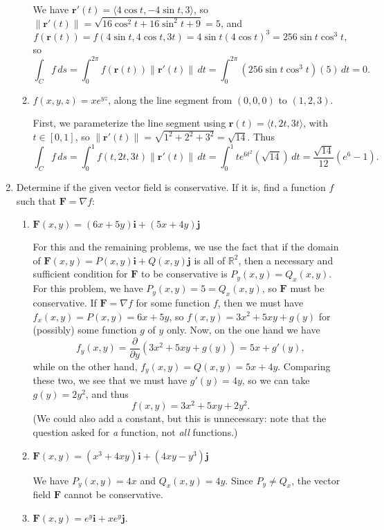 \documentclass[letterpaper,12pt]{article}
\newcommand{\R}{\mathbb{R}}
\renewcommand{\i}{\mathbf{i}}
\renewcommand{\j}{\mathbf{j}}
\renewcommand{\r}{\mathbf{r}}
\newcommand{\len}[1]{\left\lVert #1\right\rVert}
\newcommand{\F}{\mathbf{F}}
\begin{document}
\begin{enumerate}
\begin{enumerate}
\bigskip

We have $\r'(t) = \langle 4\cos t, -4\sin t, 3\rangle$, so $\len{\r'(t)} = \sqrt{16\cos^2t+16\sin^2t+9} = 5$, and 
\[
 f(\r(t)) = f(4\sin t, 4\cos t, 3t) = 4\sin t(4\cos t)^3 = 256\sin t\cos^3t,
\]
so
\[
 \int_C f\,ds = \int_0^{2\pi}f(\r(t))\len{\r'(t)}\,dt = \int_0^{2\pi} (256\sin t\cos^3t)(5)\,dt = 0.
\]

 \item $f(x,y,z)=xe^{yz}$, along the line segment from $(0,0,0)$ to $(1,2,3)$.

First, we parameterize the line segment using $\r(t) = \langle t, 2t, 3t\rangle$, with $t\in [0,1]$, so $\len{\r'(t)} = \sqrt{1^2+2^2+3^2} = \sqrt{14}$. Thus
\[
 \int_C f\,ds = \int_0^1 f(t, 2t, 3t) \len{\r'(t)}\,dt = \int_0^1 te^{6t^2}(\sqrt{14})\,dt = \frac{\sqrt{14}}{12}(e^6-1).
\]

\end{enumerate}
 \item Determine if the given vector field is conservative. If it is, find a function $f$ such that $\F=\nabla f$:
\begin{enumerate}
 \item $\F(x,y) = (6x+5y)\i + (5x+4y)\j$

\bigskip

For this and the remaining problems, we use the fact that if the domain of $\F(x,y) = P(x,y)\i+Q(x,y)\j$ is all of $\R^2$, then a necessary and sufficient condition for $\F$ to be conservative is $P_y(x,y) = Q_x(x,y)$. For this problem, we have $P_y(x,y) = 5 = Q_x(x,y)$, so $\F$ must be conservative. If $\F = \nabla f$ for some function $f$, then we must have $f_x(x,y) = P(x,y) = 6x+5y$, so $f(x,y) = 3x^2+5xy+g(y)$ for (possibly) some function $g$ of $y$ only. Now, on the one hand we have
\[
 f_y(x,y) = \frac{\partial}{\partial y}(3x^2+5xy+g(y)) = 5x+g'(y),
\]
while on the other hand, $f_y(x,y) = Q(x,y) = 5x+4y$. Comparing these two, we see that we must have $g'(y) = 4y$, so we can take $g(y) = 2y^2$, and thus
\[
 f(x,y) = 3x^2+5xy+2y^2.
\]
(We could also add a constant, but this is unnecessary: note that the question asked for \textit{a} function, not \textit{all} functions.)

 \item $\F(x,y) = (x^3+4xy)\i+(4xy-y^3)\j$

\bigskip

We have $P_y(x,y) = 4x$ and $Q_x(x,y) = 4y$. Since $P_y\neq Q_x$, the vector field $\F$ cannot be conservative.

 \item $\F(x,y) = e^y\i+xe^y\j$.


\end{enumerate}
\end{enumerate}
\end{document}
